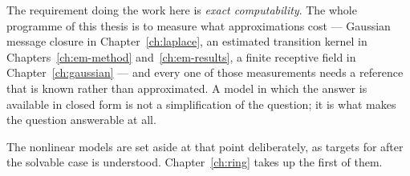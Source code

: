 The requirement doing the work here is \emph{exact computability}. The whole
programme of this thesis is to measure what approximations cost --- Gaussian
message closure in Chapter~\ref{ch:laplace}, an estimated transition kernel
in Chapters~\ref{ch:em-method} and~\ref{ch:em-results}, a finite receptive
field in Chapter~\ref{ch:gaussian} --- and every one of those measurements
needs a reference that is known rather than approximated. A model in which
the answer is available in closed form is not a simplification of the
question; it is what makes the question answerable at all.

The nonlinear models are set aside at that point deliberately, as targets for
after the solvable case is understood. Chapter~\ref{ch:ring} takes up the
first of them.
